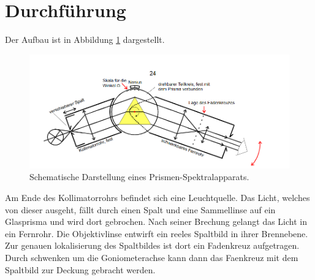 \section{Durchführung}
\label{sec:Durchführung}
Der Aufbau ist in Abbildung \ref{fig:spek} dargestellt.
\begin{figure}[H]
  \centering
  \includegraphics[scale=0.5]{content/pris_spek.png}
  \caption{Schematische Darstellung eines Prismen-Spektralapparats\cite{v402}.}
  \label{fig:spek}
\end{figure}
\noindent Am Ende des Kollimatorrohrs befindet sich eine Leuchtquelle.
Das Licht, welches von dieser ausgeht, fällt durch einen Spalt und eine Sammellinse auf ein Glasprisma und wird dort gebrochen.
Nach seiner Brechung gelangt das Licht in ein Fernrohr.
Die Objektivlinse entwirft ein reeles Spaltbild in ihrer Brennebene.
Zur genauen lokalisierung des Spaltbildes ist dort ein Fadenkreuz aufgetragen.
Durch schwenken um die Goniometerachse kann dann das Faenkreuz mit dem Spaltbild zur Deckung gebracht werden.
